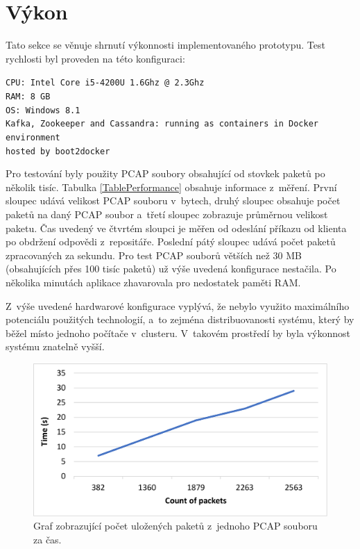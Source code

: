 \section{Výkon}
Tato sekce se věnuje shrnutí výkonnosti implementovaného prototypu. Test rychlosti byl proveden na této konfiguraci:

\vspace{0.5cm}
\noindent
\texttt{CPU: Intel Core i5-4200U 1.6Ghz @ 2.3Ghz} \\
\texttt{RAM: 8 GB} \\
\texttt{OS: Windows 8.1} \\
\texttt{Kafka, Zookeeper and Cassandra: running as containers in Docker environment} \\
\texttt{hosted by boot2docker}

\vspace{0.5cm}
\noindent
Pro testování byly použity PCAP soubory obsahující od stovkek paketů po několik tisíc. Tabulka \ref{TablePerformance} obsahuje informace z~měření. První sloupec udává velikost PCAP souboru v~bytech, druhý sloupec obsahuje počet paketů na daný PCAP soubor a~třetí sloupec zobrazuje průměrnou velikost paketu. Čas uvedený ve čtvrtém sloupci je měřen od odeslání příkazu od klienta po obdržení odpovědi z~repositáře. Poslední pátý sloupec udává počet paketů zpracovaných za sekundu. Pro test PCAP souborů větších než 30 MB (obsahujících přes 100 tisíc paketů) už výše uvedená konfigurace nestačila. Po několika minutách aplikace zhavarovala pro nedostatek paměti RAM.

Z~výše uvedené hardwarové konfigurace vyplývá, že nebylo využito maximálního potenciálu použitých technologií, a~to zejména distribuovanosti systému, který by běžel místo jednoho počítače v~clusteru. V~takovém prostředí by byla výkonnost systému znatelně vyšší.

\begin{figure}[!h]
  \centering
  \includegraphics[width=15cm]{template-fig/PerformanceChart.pdf}
  \caption{Graf zobrazující počet uložených paketů z~jednoho PCAP souboru za čas.}
  \label{FIG_PerformanceChart}
\end{figure}

